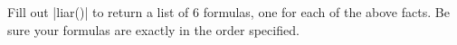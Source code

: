 \item {}
Fill out |liar()| to return a list of 6 formulas, one for each of the above
facts. Be sure your formulas are exactly in the order specified.
